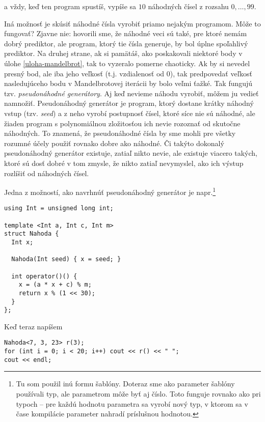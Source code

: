 a vždy, keď ten program spustíš, vypíše sa $10$ náhodných čísel z rozsahu 
$0,\ldots,99$.


Iná možnosť je skúsiť náhodné čísla vyrobiť priamo nejakým programom. Môže to 
fungovať? Zjavne nie: hovorili sme, že náhodné veci sú také, pre ktoré nemám
dobrý prediktor, ale program, ktorý tie čísla generuje, by bol úplne spoľahlivý
prediktor. Na druhej strane, ak si pamätáš, ako poskakovali niektoré body v
úlohe \ref{uloha-mandelbrot}, tak to vyzeralo pomerne chaoticky. Ak by si
nevedel presný bod, ale iba jeho veľkosť (t.j. vzdialenosť od 0), tak predpovedať
veľkosť nasledujúceho bodu v Mandelbrotovej iterácii by bolo veľmi ťažké. 
Tak fungujú tzv. {\em pseudonáhodné generátory}.
Aj keď nevieme
náhodu vyrobiť, môžem ju vedieť namnožiť. 
Pseudonáhodný generátor je program, ktorý dostane krátky náhodný vstup (tzv. 
{\em seed}) a z neho vyrobí postupnosť čísel, ktoré síce nie sú náhodné, ale žiaden
program s polynomiálnou zložitosťou ich nevie rozoznať od skutočne náhodných. To 
znamená, že pseudonáhodné čísla by sme mohli pre všetky rozumné účely použiť rovnako
dobre ako náhodné. Či takýto dokonalý pseudonáhodný generátor existuje, zatiaľ nikto
nevie, ale existuje viacero takých, 
ktoré sú dosť dobré v tom zmysle, že nikto zatiaľ nevymyslel,
ako ich výstup rozlíšiť od náhodných čísel.

 
Jedna z možností, ako navrhnúť pseudonáhodný generátor je napr.\footnote{%
  Tu som použil inú formu šablóny. Doteraz sme ako parameter šablóny 
  používali typ, ale parametrom môže byť aj číslo. Toto funguje rovnako 
  ako pri typoch -- pre každú hodnotu parametra sa vyrobí nový typ, v ktorom 
  sa v čase kompilácie parameter nahradí príslušnou hodnotou.
}

\begin{lstlisting}
using Int = unsigned long int;

template <Int a, Int c, Int m>
struct Nahoda {
  Int x; 

  Nahoda(Int seed) { x = seed; }
  
  int operator()() {
    x = (a * x + c) % m;
    return x % (1 << 30);
  }
};
\end{lstlisting}


Keď teraz napíšem

\begin{lstlisting}
Nahoda<7, 3, 23> r(3);
for (int i = 0; i < 20; i++) cout << r() << " ";
cout << endl;
\end{lstlisting}

